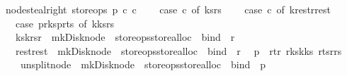 \begin{isabellebody}
\isanewline
{\isachardoublequoteopen}node{\isacharunderscore}steal{\isacharunderscore}right\ store{\isacharunderscore}ops\ p\ c{}\ c{}\ {\isacharequal}\ {\isacharparenleft}\isanewline
\ \ case\ c{}\ of\ {\isacharparenleft}ks{}{\isacharcomma}rs{}{\isacharparenright}\ {\isasymRightarrow}\ \isanewline
\ \ case\ c{}\ of\ {\isacharparenleft}k{}{\isacharhash}rest{\isacharcomma}r{}{\isacharhash}rest{\isacharprime}{\isacharparenright}\ {\isasymRightarrow}\ \isanewline
\ \ case\ {\isacharparenleft}p{\isacharbar}{\isachargreater}r{\isacharunderscore}ks{}{\isacharcomma}p{\isacharbar}{\isachargreater}r{\isacharunderscore}ts{}{\isacharparenright}\ of\ {\isacharparenleft}k{}{\isacharhash}ks{}{\isacharcomma}{\isacharunderscore}{\isacharhash}rs{}{\isacharparenright}\ {\isasymRightarrow}\ \ \ \isanewline
\ \ {\isacharparenleft}ks{}{\isacharat}{\isacharbrackleft}k{}{\isacharbrackright}{\isacharcomma}rs{}{\isacharat}{\isacharbrackleft}r{}{\isacharbrackright}{\isacharparenright}\ {\isacharbar}{\isachargreater}\ mk{\isacharunderscore}Disk{\isacharunderscore}node\ {\isacharbar}{\isachargreater}\ {\isacharparenleft}store{\isacharunderscore}ops{\isacharbar}{\isachargreater}store{\isacharunderscore}alloc{\isacharparenright}\ {\isacharbar}{\isachargreater}\ bind\ {\isacharparenleft}{\isacharpercent}\ r{}{\isachardot}\isanewline
\ \ {\isacharparenleft}rest{\isacharcomma}rest{\isacharprime}{\isacharparenright}\ {\isacharbar}{\isachargreater}\ mk{\isacharunderscore}Disk{\isacharunderscore}node\ {\isacharbar}{\isachargreater}\ {\isacharparenleft}store{\isacharunderscore}ops{\isacharbar}{\isachargreater}store{\isacharunderscore}alloc{\isacharparenright}\ {\isacharbar}{\isachargreater}\ bind\ {\isacharparenleft}{\isacharpercent}\ r{}{\isachardot}\isanewline
\ \ p\ {\isasymlparr}\ r{\isacharunderscore}t{\isacharcolon}{\isacharequal}r{}{\isacharcomma}\ r{\isacharunderscore}ks{}{\isacharcolon}{\isacharequal}k{}{\isacharhash}ks{}{\isacharcomma}\ r{\isacharunderscore}ts{}{\isacharcolon}{\isacharequal}r{}{\isacharhash}rs{}\ {\isasymrparr}\isanewline
\ \ {\isacharbar}{\isachargreater}\ unsplit{\isacharunderscore}node\ {\isacharbar}{\isachargreater}\ mk{\isacharunderscore}Disk{\isacharunderscore}node\ {\isacharbar}{\isachargreater}\ {\isacharparenleft}store{\isacharunderscore}ops{\isacharbar}{\isachargreater}store{\isacharunderscore}alloc{\isacharparenright}\ {\isacharbar}{\isachargreater}\ bind\ {\isacharparenleft}{\isacharpercent}\ p{\isachardot}\isanewline

\end{isabellebody}
